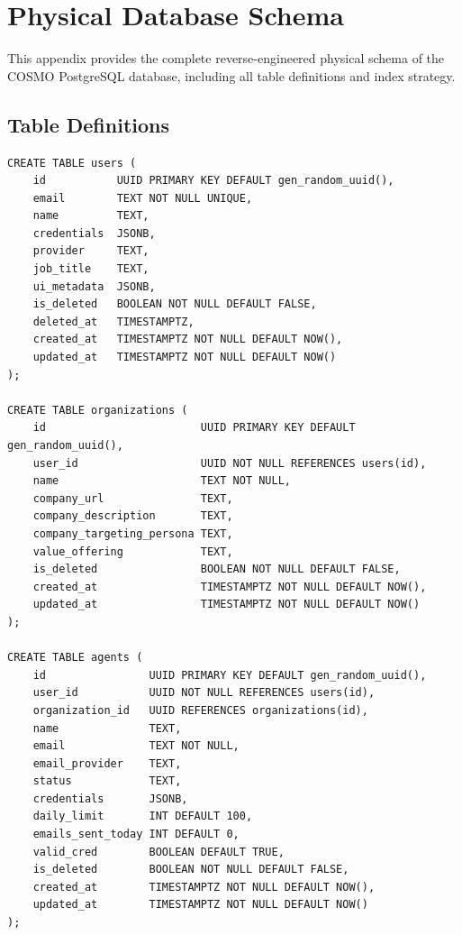 \documentclass[a4paper]{article}
\begin{document}
\newpage
\section{Physical Database Schema}
\label{appendix:physical-schema}

This appendix provides the complete reverse-engineered physical 
schema of the COSMO PostgreSQL database, including all table 
definitions and index strategy.

\subsection{Table Definitions}
\begin{tcolorbox}[sqlstyle, title=Identity and Organization]
\begin{Verbatim}[fontsize=\small]
CREATE TABLE users (
    id           UUID PRIMARY KEY DEFAULT gen_random_uuid(),
    email        TEXT NOT NULL UNIQUE,
    name         TEXT,
    credentials  JSONB,
    provider     TEXT,
    job_title    TEXT,
    ui_metadata  JSONB,
    is_deleted   BOOLEAN NOT NULL DEFAULT FALSE,
    deleted_at   TIMESTAMPTZ,
    created_at   TIMESTAMPTZ NOT NULL DEFAULT NOW(),
    updated_at   TIMESTAMPTZ NOT NULL DEFAULT NOW()
);

CREATE TABLE organizations (
    id                        UUID PRIMARY KEY DEFAULT gen_random_uuid(),
    user_id                   UUID NOT NULL REFERENCES users(id),
    name                      TEXT NOT NULL,
    company_url               TEXT,
    company_description       TEXT,
    company_targeting_persona TEXT,
    value_offering            TEXT,
    is_deleted                BOOLEAN NOT NULL DEFAULT FALSE,
    created_at                TIMESTAMPTZ NOT NULL DEFAULT NOW(),
    updated_at                TIMESTAMPTZ NOT NULL DEFAULT NOW()
);

CREATE TABLE agents (
    id                UUID PRIMARY KEY DEFAULT gen_random_uuid(),
    user_id           UUID NOT NULL REFERENCES users(id),
    organization_id   UUID REFERENCES organizations(id),
    name              TEXT,
    email             TEXT NOT NULL,
    email_provider    TEXT,
    status            TEXT,
    credentials       JSONB,
    daily_limit       INT DEFAULT 100,
    emails_sent_today INT DEFAULT 0,
    valid_cred        BOOLEAN DEFAULT TRUE,
    is_deleted        BOOLEAN NOT NULL DEFAULT FALSE,
    created_at        TIMESTAMPTZ NOT NULL DEFAULT NOW(),
    updated_at        TIMESTAMPTZ NOT NULL DEFAULT NOW()
);
\end{Verbatim}
\end{tcolorbox}
\end{document}
